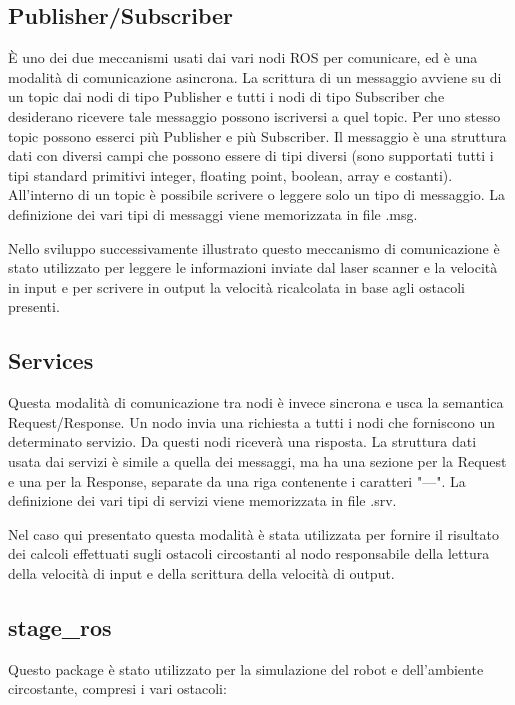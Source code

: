 \documentclass[Lau, binding=0.6cm, oneside]{sapthesis}
\begin{document}
\subsection{Publisher/Subscriber}
È uno dei due meccanismi usati dai vari nodi ROS per comunicare, ed è una modalità di comunicazione asincrona.
La scrittura di un messaggio avviene su di un topic dai nodi di tipo Publisher e tutti i nodi di tipo Subscriber che desiderano ricevere tale messaggio possono iscriversi a quel topic.
Per uno stesso topic possono esserci più Publisher e più Subscriber.
Il messaggio è una struttura dati con diversi campi che possono essere di tipi diversi (sono supportati tutti i tipi standard primitivi integer, floating point, boolean, array e costanti).
All’interno di un topic è possibile scrivere o leggere solo un tipo di messaggio.
La definizione dei vari tipi di messaggi viene memorizzata in file .msg.

Nello sviluppo successivamente illustrato questo meccanismo di comunicazione è stato utilizzato per leggere le informazioni inviate dal laser scanner e la velocità in input e per scrivere in output la velocità ricalcolata in base agli ostacoli presenti.

\subsection{Services}
Questa modalità di comunicazione tra nodi è invece sincrona e usca la semantica Request/Response.
Un nodo invia una richiesta a tutti i nodi che forniscono un determinato servizio.
Da questi nodi riceverà una risposta.
La struttura dati usata dai servizi è simile a quella dei messaggi, ma ha una sezione per la Request e una per la Response, separate da una riga contenente i caratteri "---".
La definizione dei vari tipi di servizi viene memorizzata in file .srv.

Nel caso qui presentato questa modalità è stata utilizzata per fornire il risultato dei calcoli effettuati sugli ostacoli circostanti al nodo responsabile della lettura della velocità di input e della scrittura della velocità di output.

\subsection{stage\_ros}
Questo package è stato utilizzato per la simulazione del robot e dell'ambiente circostante, compresi i vari ostacoli:
\end{document}
